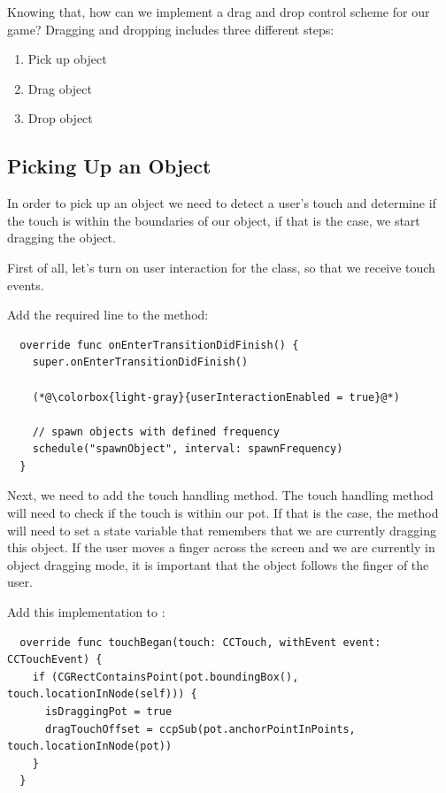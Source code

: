 Knowing that, how can we implement a drag and drop control scheme for our game?
Dragging and dropping includes three different steps:
\begin{enumerate}
  \item Pick up object
  \item Drag object
  \item Drop object
\end{enumerate}

\subsection{Picking Up an Object}
In order to pick up an object we need to detect a user's touch and determine if
the touch is within the boundaries of our object, if that is the case,
we start dragging the object.

First of all, let's turn on user interaction for the 
class, so that we receive touch events.

\begin{leftbar}
Add the required line to the  method:
\begin{lstlisting}
  override func onEnterTransitionDidFinish() {
    super.onEnterTransitionDidFinish()
    
    (*@\colorbox{light-gray}{userInteractionEnabled = true}@*) 
    
    // spawn objects with defined frequency
    schedule("spawnObject", interval: spawnFrequency)
  }
\end{lstlisting}
\end{leftbar}

Next, we need to add the touch handling method. The touch handling method will
need to check if the touch is within our pot. If that is the case, the method
will need to set a state variable that remembers that we are currently dragging
this object. If the user moves a finger across the screen and we are currently
in object dragging mode, it is important that the object follows the finger of
the user.

\begin{leftbar}
Add this implementation to :
\begin{lstlisting}
  override func touchBegan(touch: CCTouch, withEvent event: CCTouchEvent) {
    if (CGRectContainsPoint(pot.boundingBox(), touch.locationInNode(self))) {
      isDraggingPot = true
      dragTouchOffset = ccpSub(pot.anchorPointInPoints, touch.locationInNode(pot))
    }
  }
\end{lstlisting}
\end{leftbar}

